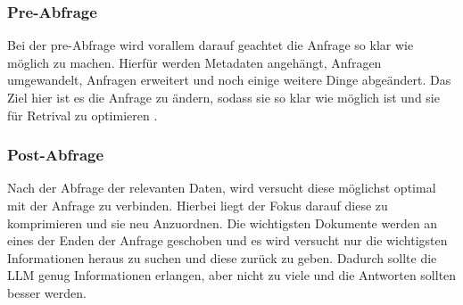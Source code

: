 \subsubsection{Pre-Abfrage}
Bei der pre-Abfrage wird vorallem darauf geachtet die Anfrage so klar wie möglich zu machen.
Hierfür werden Metadaten angehängt, Anfragen umgewandelt, Anfragen erweitert und noch 
einige weitere Dinge abgeändert. Das Ziel hier ist es die Anfrage zu ändern, sodass sie so 
klar wie möglich ist und sie für Retrival zu optimieren \cite{gaoRetrievalAugmentedGenerationLarge2024, lewisRetrievalAugmentedGenerationKnowledgeIntensive2021}.\par
\subsubsection{Post-Abfrage}
Nach der Abfrage der relevanten Daten, wird
versucht diese möglichst optimal mit der Anfrage zu verbinden.
Hierbei liegt der Fokus darauf diese zu komprimieren und sie neu Anzuordnen. 
Die wichtigsten Dokumente werden an eines der Enden der Anfrage 
geschoben und es wird versucht nur die wichtigsten Informationen heraus zu suchen
und diese zurück zu geben. Dadurch sollte die LLM genug Informationen 
erlangen, aber nicht zu viele und die Antworten sollten besser werden\cite{gaoRetrievalAugmentedGenerationLarge2024, lewisRetrievalAugmentedGenerationKnowledgeIntensive2021}.

